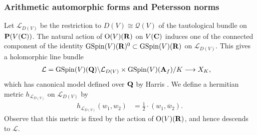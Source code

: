 \documentclass{amsart}
\theoremstyle{definition}
\theoremstyle{definition}
\theoremstyle{definition}
\begin{document}
\subsubsection{Arithmetic automorphic forms and Petersson norms}

Let $\mathcal{L}_{D(V)}$ be the restriction to $D(V) \cong \mathcal{Q}(V)$ of the tautological bundle on ${\bf{P}}(V({\bf{C}}))$.
The natural action of $\operatorname{O}(V)({\bf{R}})$ on $V({\bf{C}})$ induces one of the connected component of the identity
$\operatorname{GSpin}(V)({\bf{R}})^0 \subset \operatorname{GSpin}(V)({\bf{R}})$ on $\mathcal{L}_{D(V)}$. This gives a holomorphic line bundle
\begin{align*} \mathcal{L} &= \operatorname{GSpin}(V)({\bf{Q}}) \backslash \mathcal{L}_{D(V)} \times
\operatorname{GSpin}(V)({\bf{A}}_f) / K \longrightarrow X_K, \end{align*}
which has canonical model defined over ${\bf{Q}}$ by Harris \cite{Ha}.
We define a hermitian metric $h_{\mathcal{L}_{D(V)}}$ on $\mathcal{L}_{D(V)}$ by 
\begin{align*} h_{\mathcal{L}_{D(V)}}(w_1, w_2) &= \frac{1}{2} \cdot (w_1, \overline{w}_2). \end{align*}
Observe that this metric is fixed by the action of $\operatorname{O}(V)({\bf{R}})$, and hence descends to $\mathcal{L}$. 
\end{document}
